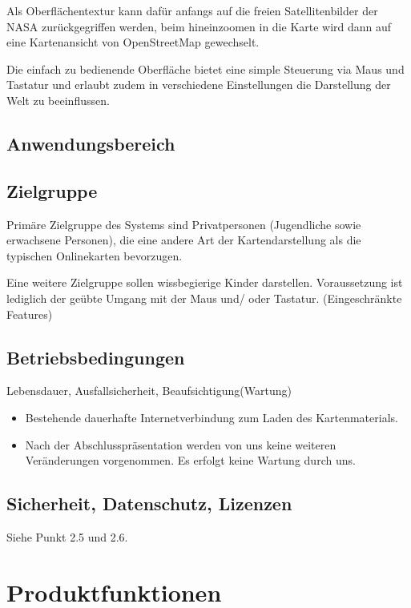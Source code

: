 \documentclass[10pt]{scrreprt}
\begin{document}
Als Oberflächentextur kann dafür anfangs auf die freien Satellitenbilder der
NASA zurückgegriffen werden, beim hineinzoomen in die Karte wird dann auf eine Kartenansicht von OpenStreetMap gewechselt.

Die einfach zu bedienende Oberfläche bietet eine simple Steuerung via Maus und Tastatur und erlaubt zudem in verschiedene Einstellungen die Darstellung der Welt zu beeinflussen. 


\section{Anwendungsbereich}


\section{Zielgruppe}
Primäre Zielgruppe des Systems sind Privatpersonen (Jugendliche sowie erwachsene Personen), die eine andere Art der Kartendarstellung als die typischen Onlinekarten bevorzugen.

Eine weitere Zielgruppe sollen wissbegierige Kinder darstellen. Voraussetzung ist lediglich der geübte Umgang mit der Maus und/ oder Tastatur. (Eingeschränkte Features)

\section{Betriebsbedingungen}
Lebensdauer, Ausfallsicherheit, Beaufsichtigung(Wartung)

\begin{itemize}
\item Bestehende dauerhafte Internetverbindung zum Laden des Kartenmaterials.
\item Nach  der  Abschlusspräsentation  werden  von  uns  keine  weiteren 
Veränderungen vorgenommen. Es erfolgt keine Wartung durch uns.
\end{itemize} 

\section{Sicherheit, Datenschutz, Lizenzen}
Siehe Punkt 2.5 und 2.6.




\chapter{Produktfunktionen}

\renewcommand{\labelenumi}{\textbf{/F\numprint{\theenumi}0/}}
\end{document}
